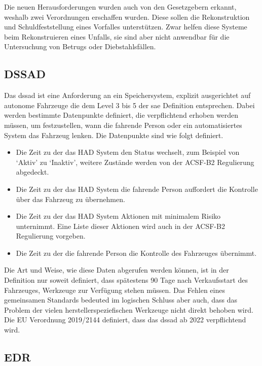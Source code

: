 \documentclass[conference,compsoc,final,a4paper]{IEEEtran}
\begin{document}
Die neuen Herausforderungen wurden auch von den Gesetzgebern erkannt, weshalb zwei Verordnungen erschaffen wurden.
Diese sollen die Rekonstruktion und Schuldfeststellung eines Vorfalles unterstützen.
Zwar helfen diese Systeme beim Rekonstruieren eines Unfalls, sie sind aber nicht anwendbar für die Untersuchung von Betrugs oder Diebstahlsfällen.~\cite{Boehm2020}

\subsection{DSSAD}

Das \ac{dssad} ist eine Anforderung an ein Speichersystem, explizit ausgerichtet auf autonome Fahrzeuge die dem Level 3 bis 5 der \ac{sae} Definition entsprechen.
Dabei werden bestimmte Datenpunkte definiert, die verpflichtend erhoben werden müssen, um festzustellen, wann die fahrende Person oder ein automatisiertes System das Fahrzeug lenken.
Die Datenpunkte sind wie folgt definiert.
\begin{itemize}
  \item Die Zeit zu der das \ac{HAD} System den Status wechselt, zum Beispiel von `Aktiv' zu `Inaktiv', weitere Zustände werden von der ACSF-B2 Regulierung abgedeckt.
  \item Die Zeit zu der das \ac{HAD} System die fahrende Person auffordert die Kontrolle über das Fahrzeug zu übernehmen.
  \item Die Zeit zu der das \ac{HAD} System Aktionen mit minimalem Risiko unternimmt. Eine Liste dieser Aktionen wird auch in der ACSF-B2 Regulierung vorgeben.
  \item Die Zeit zu der die fahrende Person die Kontrolle des Fahrzeuges übernimmt.
\end{itemize}

Die Art und Weise, wie diese Daten abgerufen werden können, ist in der Definition nur soweit definiert, dass spätestens 90 Tage nach Verkaufsstart des Fahrzeuges, Werkzeuge
zur Verfügung stehen müssen. Das Fehlen eines gemeinsamen Standards bedeuted im logischen Schluss aber auch, dass das Problem der vielen
herstellerspeziefischen Werkzeuge nicht direkt behoben wird.\\
Die EU Verordnung 2019/2144 definiert, dass das \ac{dssad} ab 2022 verpflichtend wird.

\subsection{EDR}
\end{document}
